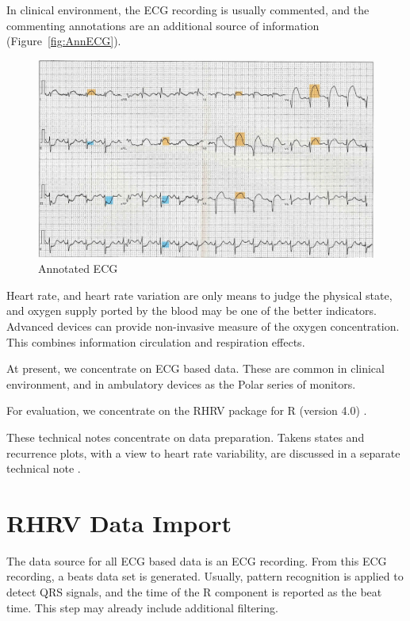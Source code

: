 \documentclass[a4paper, english, utf8]{amsart}
\newcommand{\figref}[1]{Figure\ \vref{#1}}
\begin{document}
In  clinical environment, the ECG recording is usually commented, and
the commenting annotations are an additional source of information
(\figref{fig:AnnECG}).
\begin{figure}[htbp]
\begin{center}
\includegraphics[width=0.8\linewidth]{../media/12-Lead-ECG-showing-ST-Elevation-orange.jpg}

\caption{Annotated ECG}
\label{fig:AnnECG}
\end{center}
\end{figure}


Heart rate, and heart rate variation are only means to judge the
physical state, and oxygen supply ported by the blood may be one of the
better indicators. Advanced devices can provide non-invasive measure of
the oxygen concentration. This combines information circulation and
respiration effects.

At present, we concentrate on ECG based data. These are common in
clinical environment, and in ambulatory devices as the Polar series of
monitors.

For evaluation, we concentrate on the RHRV package for R (version 4.0) \cite{RHRV-Mendez:2014aa}.

These technical notes concentrate on data preparation. Takens states and recurrence plots, with a view to heart rate variability, are discussed in a separate technical note \cite{Sawitzki:2013recurrence}.

\section{RHRV Data Import}

The data source for all ECG based data is an ECG recording. 
From this ECG recording, a beats data set is generated. 
Usually, pattern recognition is applied to detect QRS signals, and the 
time of the R component is reported as the beat time. 
This step may already include additional filtering.
\end{document}
